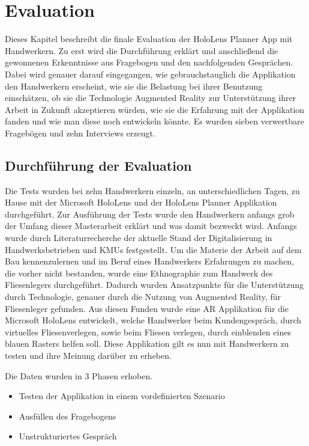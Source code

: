 \chapter{Evaluation}

Dieses Kapitel beschreibt die finale Evaluation der HoloLens Planner App mit Handwerkern. Zu erst wird die Durchführung erklärt und anschließend die gewonnenen Erkenntnisse aus Fragebogen und den nachfolgenden Gesprächen. Dabei wird genauer darauf eingegangen, wie gebrauchstauglich die Applikation den Handwerkern erscheint, wie sie die Belastung bei ihrer Benutzung einschätzen, ob sie die Technologie Augmented Reality zur Unterstützung ihrer Arbeit in Zukunft akzeptieren würden, wie sie die Erfahrung mit der Applikation fanden und wie man diese noch entwickeln könnte. Es wurden sieben verwertbare Fragebögen und zehn Interviews erzeugt.

\section{Durchführung der Evaluation}

Die Tests wurden bei zehn Handwerkern einzeln, an unterschiedlichen Tagen, zu Hause mit der Microsoft HoloLens und der HoloLens Planner Applikation durchgeführt. Zur Ausführung der Tests wurde den Handwerkern anfangs grob der Umfang dieser Masterarbeit erklärt und was damit bezweckt wird. Anfangs wurde durch Literaturrecherche der aktuelle Stand der Digitalisierung in Handwerksbetrieben und KMUs festgestellt. Um die Materie der Arbeit auf dem Bau kennenzulernen und im Beruf eines Handwerkers Erfahrungen zu machen, die vorher nicht bestanden, wurde eine Ethnographie zum Handwerk des Fliesenlegers durchgeführt. Dadurch wurden Ansatzpunkte für die Unterstützung durch Technologie, genauer durch die Nutzung von Augmented Reality, für Fliesenleger gefunden. Aus diesen Funden wurde eine AR Applikation für die Microsoft HoloLens entwickelt, welche Handwerker beim Kundengespräch, durch virtuelles Fliesenverlegen, sowie beim Fliesen verlegen, durch einblenden eines blauen Rasters helfen soll. Diese Applikation gilt es nun mit Handwerkern zu testen und ihre Meinung darüber zu erheben. 

Die Daten wurden in 3 Phasen erhoben. 

\begin{itemize}
	\item Testen der Applikation in einem vordefinierten Szenario
	\item Ausfüllen des Fragebogens
	\item Unstrukturiertes Gespräch
\end{itemize}

